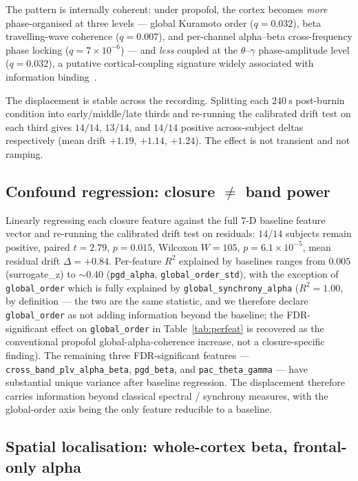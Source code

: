 \documentclass[11pt,a4paper]{article}
\begin{document}
The pattern is internally coherent: under propofol, the cortex becomes \emph{more} phase-organised at three levels --- global Kuramoto order ($q=0.032$), beta travelling-wave coherence ($q=0.007$), and per-channel alpha--beta cross-frequency phase locking ($q=7\!\times\!10^{-6}$) --- and \emph{less} coupled at the $\theta$--$\gamma$ phase-amplitude level ($q=0.032$), a putative cortical-coupling signature widely associated with information binding~\cite{tort2010measuring,canolty2006high}.

The displacement is stable across the recording. Splitting each $\SI{240}{\second}$ post-burnin condition into early/middle/late thirds and re-running the calibrated drift test on each third gives $14/14$, $13/14$, and $14/14$ positive across-subject deltas respectively (mean drift $+1.19$, $+1.14$, $+1.24$). The effect is not transient and not ramping.

\subsection{Confound regression: closure $\not=$ band power}

Linearly regressing each closure feature against the full $7$-D baseline feature vector and re-running the calibrated drift test on residuals: $14/14$ subjects remain positive, paired $t=2.79$, $p=0.015$, Wilcoxon $W=105$, $p=6.1\!\times\!10^{-5}$, mean residual drift $\Delta=+0.84$. Per-feature $R^2$ explained by baselines ranges from $0.005$ (surrogate\_z) to $\sim 0.40$ (\texttt{pgd\_alpha}, \texttt{global\_order\_std}), with the exception of \texttt{global\_order} which is fully explained by \texttt{global\_synchrony\_alpha} ($R^2=1.00$, by definition --- the two are the same statistic, and we therefore declare \texttt{global\_order} as not adding information beyond the baseline; the FDR-significant effect on \texttt{global\_order} in Table~\ref{tab:perfeat} is recovered as the conventional propofol global-alpha-coherence increase, not a closure-specific finding). The remaining three FDR-significant features --- \texttt{cross\_band\_plv\_alpha\_beta}, \texttt{pgd\_beta}, and \texttt{pac\_theta\_gamma} --- have substantial unique variance after baseline regression. The displacement therefore carries information beyond classical spectral / synchrony measures, with the global-order axis being the only feature reducible to a baseline.

\subsection{Spatial localisation: whole-cortex beta, frontal-only alpha}\label{sec:spatial}
\end{document}
